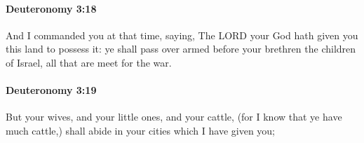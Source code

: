 		\paragraph{Deuteronomy 3:18} %
			\label{DEUTERONOMY-3-18}

			And I commanded you at that time, saying, The LORD your God hath given you this land to possess it: ye shall pass over armed before your brethren the children of Israel, all that are meet for the war.


		\paragraph{Deuteronomy 3:19} %
			\label{DEUTERONOMY-3-19}

			But your wives, and your little ones, and your cattle, (for I know that ye have much cattle,) shall abide in your cities which I have given you;


